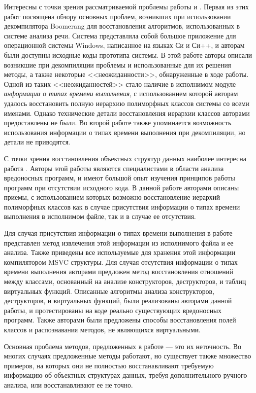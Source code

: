 Интересны с точки зрения рассматриваемой проблемы работы \cite{emmerik04} и \cite{emmerik07}. Первая из этих работ посвящена обзору основных проблем, возникших при использовании декомпилятора Boomerang \cite{boomerang} для восстановления алгоритмов, использованных в системе анализа речи. Система представляла собой большое приложение для операционной системы Windows, написанное на языках Си и Си++, и авторам были доступны исходные коды прототипа системы. В этой работе авторы описали возникшие при декомпиляции проблемы и использованные для их решения методы, а также некоторые <<неожиданности>>, обнаруженные в ходе работы. Одной из таких <<неожиданностей>> стало наличие в исполнимом модуле {\it информации о типах времени выполнения}, с использованием которой авторам удалось восстановить полную иерархию полиморфных классов системы со всеми именами. Однако технические детали восстановления иерархии классов авторами предоставлены не были. Во второй работе также упоминается возможность использования информации о типах времени выполнения при декомпиляции, но детали не приводятся.

С точки зрения восстановления объектных структур данных наиболее интересна работа \cite{sabanal07}. Авторы этой работы являются специалистами в области анализа вредоносных программ, и имеют большой опыт изучения принципов работы программ при отсутствии исходного кода. В данной работе авторами описаны приемы, с использованием которых возможно восстановление иерархий полиморфных классов как в случае присутствия информации о типах времени выполнения в исполнимом файле, так и в случае ее отсутствия.

Для случая присутствия информации о типах времени выполнения в работе представлен метод извлечения этой информации из исполнимого файла и ее анализа. Также приведены все используемые для хранения этой информации компилятором MSVC структуры. Для случая отсутствия информации о типах времени выполнения авторами предложен метод восстановления отношений между классами, основанный на анализе конструкторов, деструкторов, и таблиц виртуальных функций. Описанные алгоритмы анализа конструкторов, деструкторов, и виртуальных функций, были реализованы авторами данной работы, и протестированы на коде реально существующих вредоносных программ. Также авторами были предложены способы восстановления полей классов и распознавания методов, не являющихся виртуальными.

Основная проблема методов, предложенных в работе \cite{sabanal07} --- это их неточность. Во многих случаях предложенные методы работают, но существует также множество примеров, на которых они не полностью восстанавливают требуемую информацию об объектных структурах данных, требуя дополнительного ручного анализа, или восстанавливают ее не точно.

